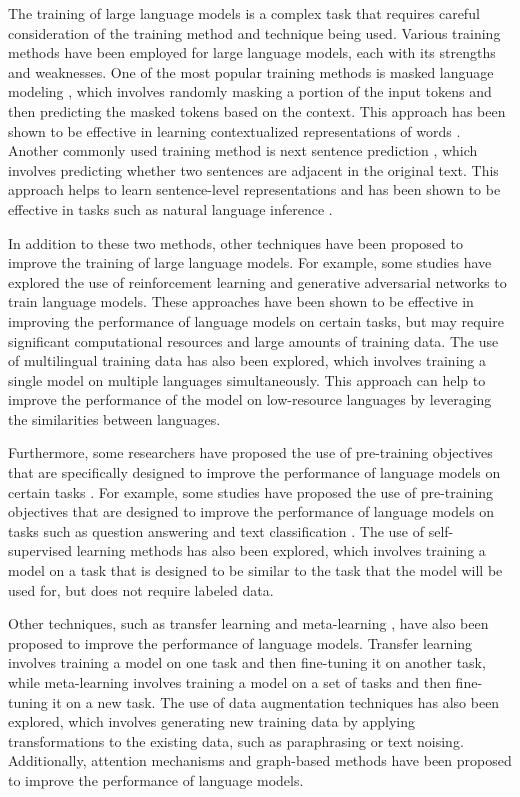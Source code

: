 \documentclass[11pt]{article}
\begin{document}
The training of large language models is a complex task that requires careful consideration of the training method and technique being used. Various training methods have been employed for large language models, each with its strengths and weaknesses. One of the most popular training methods is masked language modeling \cite{ref65}, which involves randomly masking a portion of the input tokens and then predicting the masked tokens based on the context. This approach has been shown to be effective in learning contextualized representations of words \cite{ref66}. Another commonly used training method is next sentence prediction \cite{ref66}, which involves predicting whether two sentences are adjacent in the original text. This approach helps to learn sentence-level representations and has been shown to be effective in tasks such as natural language inference \cite{ref67}.

In addition to these two methods, other techniques have been proposed to improve the training of large language models. For example, some studies have explored the use of reinforcement learning \cite{ref68} and generative adversarial networks \cite{ref69} to train language models. These approaches have been shown to be effective in improving the performance of language models on certain tasks, but may require significant computational resources and large amounts of training data. The use of multilingual training data \cite{ref70} has also been explored, which involves training a single model on multiple languages simultaneously. This approach can help to improve the performance of the model on low-resource languages by leveraging the similarities between languages.

Furthermore, some researchers have proposed the use of pre-training objectives that are specifically designed to improve the performance of language models on certain tasks \cite{ref71}. For example, some studies have proposed the use of pre-training objectives that are designed to improve the performance of language models on tasks such as question answering \cite{ref67} and text classification \cite{ref72}. The use of self-supervised learning methods \cite{ref73} has also been explored, which involves training a model on a task that is designed to be similar to the task that the model will be used for, but does not require labeled data.

Other techniques, such as transfer learning \cite{ref74} and meta-learning \cite{ref68}, have also been proposed to improve the performance of language models. Transfer learning involves training a model on one task and then fine-tuning it on another task, while meta-learning involves training a model on a set of tasks and then fine-tuning it on a new task. The use of data augmentation techniques \cite{ref75} has also been explored, which involves generating new training data by applying transformations to the existing data, such as paraphrasing or text noising. Additionally, attention mechanisms \cite{ref76} and graph-based methods \cite{ref77} have been proposed to improve the performance of language models.
\end{document}
